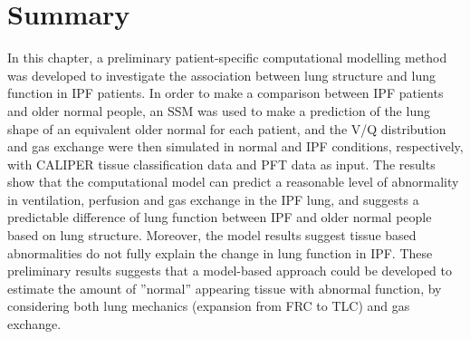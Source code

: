 \section{Summary}
In this chapter, a preliminary patient-specific computational modelling method was developed to investigate the association between lung structure and lung function in IPF patients. In order to make a comparison between IPF patients and older normal people, an SSM was used to make a prediction of the lung shape of an equivalent older normal for each patient, and the V/Q distribution and gas exchange were then simulated in normal and IPF conditions, respectively, with CALIPER tissue classification data and PFT data as input. The results show that the computational model can predict a reasonable level of abnormality in ventilation, perfusion and gas exchange in the IPF lung, and suggests a predictable difference of lung function between IPF and older normal people based on lung structure. Moreover, the model results suggest tissue based abnormalities do not fully explain the change in lung function in IPF. These preliminary results suggests that a model-based approach could be developed to estimate the amount of ''normal'' appearing tissue with abnormal function, by considering both lung mechanics (expansion from FRC to TLC) and gas exchange.